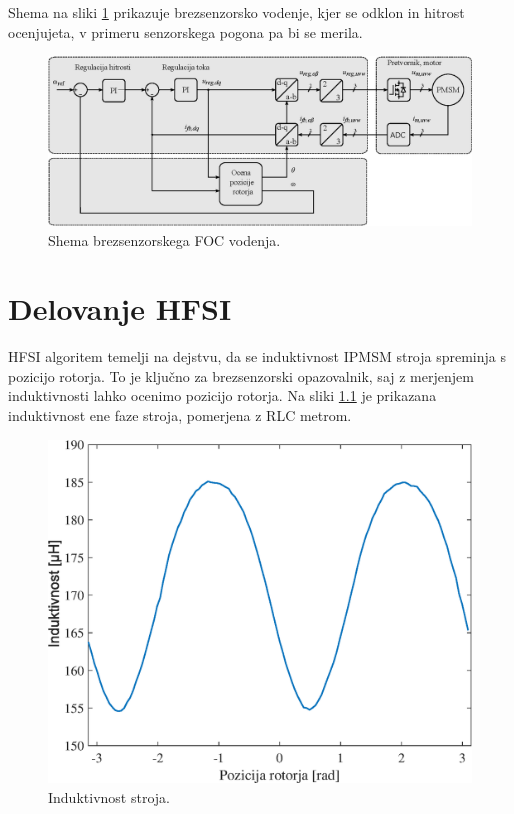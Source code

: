 \documentclass[a4paper,twoside,openright,12pt,slovene]{book}
\begin{document}
Shema na sliki \ref{FOCshema} prikazuje brezsenzorsko vodenje, kjer se odklon in hitrost ocenjujeta, v primeru senzorskega pogona pa bi se merila.

\begin{figure}[!htbp]
    \centering
    \includegraphics[width=1\columnwidth]{Slike/Inkscape/FOCsimple.eps}
    \caption{\label{FOCshema} Shema brezsenzorskega FOC vodenja.}
\end{figure}



\chapter{Delovanje HFSI} \label{teorija}

HFSI algoritem temelji na dejstvu, da se induktivnost IPMSM stroja spreminja s pozicijo rotorja. To je ključno za brezsenzorski opazovalnik, saj z merjenjem induktivnosti lahko ocenimo pozicijo
rotorja. Na sliki \ref{induktivnostStroja} je prikazana induktivnost ene faze stroja, pomerjena z RLC metrom.

\begin{figure}[!htbp]
    \centering
    \includegraphics[width=0.72\columnwidth]{Slike/induktivnostStroja.eps}
    \caption{\label{induktivnostStroja} Induktivnost stroja. }
\end{figure}
\end{document}
